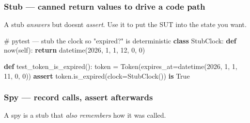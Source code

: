 \documentclass[11pt]{article}
\newenvironment{Shaded}{\begin{snugshade}}{\end{snugshade}}
\newcommand{\CommentTok}[1]{\textcolor[rgb]{0.48,0.49,0.49}{#1}}
\newcommand{\ControlFlowTok}[1]{\textcolor[rgb]{0.99,0.74,0.29}{\textbf{#1}}}
\newcommand{\DecValTok}[1]{\textcolor[rgb]{0.96,0.45,0.00}{#1}}
\newcommand{\KeywordTok}[1]{\textcolor[rgb]{0.81,0.81,0.76}{\textbf{#1}}}
\newcommand{\NormalTok}[1]{\textcolor[rgb]{0.81,0.81,0.76}{#1}}
\newcommand{\OperatorTok}[1]{\textcolor[rgb]{0.81,0.81,0.76}{#1}}
\newcommand{\VariableTok}[1]{\textcolor[rgb]{0.15,0.68,0.68}{#1}}
\begin{document}
\subsubsection{Stub --- canned return values to drive a code path}\label{stub--canned-return-values-to-drive-a-code-path}

A stub \emph{answers} but doesn\textquotesingle t \emph{assert}. Use it to put the SUT into the state you want.


\begin{Shaded}
\begin{Highlighting}[]
\CommentTok{\# pytest — stub the clock so "expired?" is deterministic}
\KeywordTok{class}\NormalTok{ StubClock:}
    \KeywordTok{def}\NormalTok{ now(}\VariableTok{self}\NormalTok{):}
        \ControlFlowTok{return}\NormalTok{ datetime(}\DecValTok{2026}\NormalTok{, }\DecValTok{1}\NormalTok{, }\DecValTok{1}\NormalTok{, }\DecValTok{12}\NormalTok{, }\DecValTok{0}\NormalTok{, }\DecValTok{0}\NormalTok{)}

\KeywordTok{def}\NormalTok{ test\_token\_is\_expired():}
\NormalTok{    token }\OperatorTok{=}\NormalTok{ Token(expires\_at}\OperatorTok{=}\NormalTok{datetime(}\DecValTok{2026}\NormalTok{, }\DecValTok{1}\NormalTok{, }\DecValTok{1}\NormalTok{, }\DecValTok{11}\NormalTok{, }\DecValTok{0}\NormalTok{, }\DecValTok{0}\NormalTok{))}
    \ControlFlowTok{assert}\NormalTok{ token.is\_expired(clock}\OperatorTok{=}\NormalTok{StubClock()) }\KeywordTok{is} \VariableTok{True}
\end{Highlighting}
\end{Shaded}

\subsubsection{Spy --- record calls, assert afterwards}\label{spy--record-calls-assert-afterwards}

A spy is a stub that \emph{also remembers} how it was called.

\end{document}
